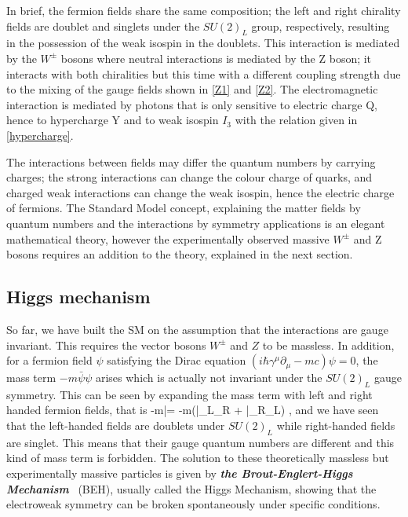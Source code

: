 In brief, the fermion fields share the same composition; the left and right chirality fields are doublet and singlets under the $SU(2)_L$ group, respectively, resulting in the possession of the weak isospin in the doublets. This interaction is mediated by the $W^\pm$ bosons where neutral interactions is mediated by the Z boson; it interacts with both chiralities but this time with a different coupling strength due to the mixing of the gauge fields shown in \autoref{Z1} and \autoref{Z2}. The electromagnetic interaction is mediated by photons that is only sensitive to electric charge Q, hence to hypercharge Y and to weak isospin $I_3$ with the relation given in \autoref{hypercharge}.

The interactions between fields may differ the quantum numbers by carrying charges; the strong interactions can change the colour charge of quarks, and charged weak interactions can change the weak isospin, hence the electric charge of fermions. The Standard Model concept, explaining the matter fields by quantum numbers and the interactions by symmetry applications is an elegant mathematical theory, however the experimentally observed massive $W^\pm$ and Z bosons requires an addition to the theory, explained in the next section.

\subsection{Higgs mechanism}\label{higgsmechanismsection}

So far, we have built the SM on the assumption that the interactions are gauge invariant. This requires the vector bosons $W^\pm$ and $Z$ to be massless. In addition, for a fermion field $\psi$ satisfying the Dirac equation $ (i\hbar\gamma^\mu\partial_\mu-mc)\psi = 0$, the mass term $-m\bar\psi\psi$ arises which is actually not invariant under the $SU(2)_L$ gauge symmetry. This can be seen by expanding the mass term with left and right handed fermion fields, that is
\be
-m\bar\psi\psi = -m\left(\bar\psi_L\psi_R + \bar\psi_R\psi_L\right) ,
\ee
and we have seen that the left-handed fields are doublets under $SU(2)_L$ while right-handed fields are singlet. This means that their gauge quantum numbers are different and this kind of mass term is forbidden. 
The solution to these theoretically massless but experimentally massive particles is given by \textbf{\emph{the Brout-Englert-Higgs Mechanism}}~\cite{Higgs1964, BroutEnglert, Guralnik1964} (BEH), usually called the Higgs Mechanism, showing that the electroweak symmetry can be broken spontaneously under specific conditions. 

